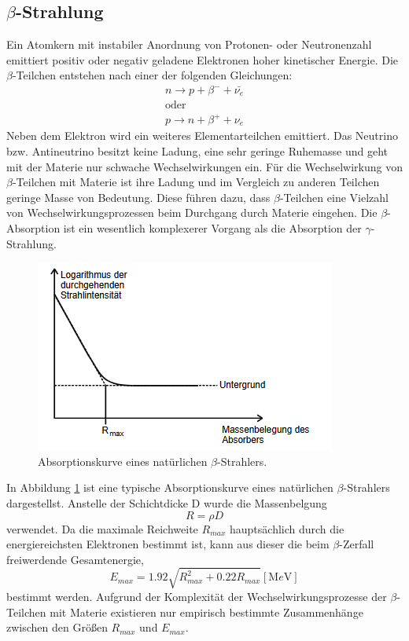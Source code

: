 \subsection{\texorpdfstring{$\beta$}{Beta}-Strahlung}
Ein Atomkern mit instabiler Anordnung von Protonen- oder Neutronenzahl emittiert positiv oder negativ geladene Elektronen hoher kinetischer Energie.
Die $\beta$-Teilchen entstehen nach einer der folgenden Gleichungen:
\begin{eqnarray}
n \rightarrow p + \beta^- + \bar{\nu_e} \\
\nonumber
\text{oder}\\
p \rightarrow n + \beta^+ + \nu_e 
\end{eqnarray}
Neben dem Elektron wird ein weiteres Elementarteilchen emittiert.
Das Neutrino bzw. Antineutrino besitzt keine Ladung, eine sehr geringe Ruhemasse und geht mit der Materie nur schwache Wechselwirkungen ein.
Für die Wechselwirkung von $\beta$-Teilchen mit Materie ist ihre Ladung und im Vergleich zu anderen Teilchen geringe Masse von Bedeutung.
Diese führen dazu, dass $\beta$-Teilchen eine Vielzahl von Wechselwirkungsprozessen beim Durchgang durch Materie eingehen.
Die $\beta$-Absorption ist ein wesentlich komplexerer Vorgang als die Absorption der $\gamma$-Strahlung.
\begin{figure}[H]
    \centering
    \includegraphics[scale=0.7]{content/Absorbbeta.png}
    \caption{Absorptionskurve eines natürlichen $\beta$-Strahlers.}
    \label{fig:abs}
\end{figure}
\noindent
In Abbildung \ref{fig:abs} ist eine typische Absorptionskurve eines natürlichen $\beta$-Strahlers dargestellst.
Anstelle der Schichtdicke D wurde die Massenbelgung
\begin{equation}
  R = \rho D
\end{equation}
verwendet.
Da die maximale Reichweite $R_{max}$ hauptsächlich durch die energiereichsten Elektronen bestimmt ist, kann aus dieser die beim $\beta$-Zerfall freiwerdende Gesamtenergie,
\begin{equation}
  E_{max}= 1.92  \sqrt{R_{max}^2 +0.22R_{max}} [\si{\mega e\volt}]
\end{equation}
bestimmt werden.
Aufgrund der Komplexität der Wechselwirkungsprozesse der $\beta$-Teilchen mit Materie existieren nur empirisch bestimmte Zusammenhänge zwischen den Größen $R_{max}$ und $E_{max}$.
